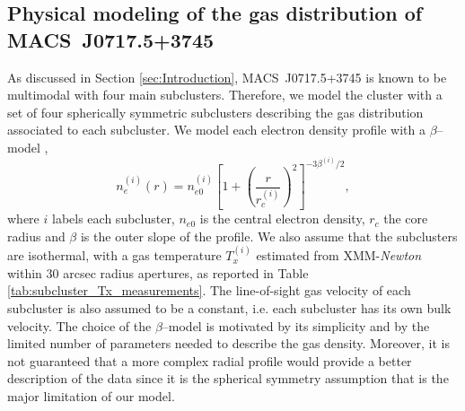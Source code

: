 \documentclass[twocolumn,traditabstract]{aa}
\begin{document}
\subsection{Physical modeling of the gas distribution of \mbox{MACS~J0717.5+3745}}\label{sec:Physical_modeling_of_the_gas_distribution}
As discussed in Section \ref{sec:Introduction}, \mbox{MACS~J0717.5+3745} is known to be multimodal with four main subclusters. Therefore, we model the cluster with a set of four spherically symmetric subclusters describing the gas distribution associated to each subcluster. We model each electron density profile with a $\beta$--model \citep{Cavaliere1978},
\begin{equation}
	n_e^{(i)}(r) = n_{e0}^{(i)} \left[1+\left(\frac{r}{r_c^{(i)}}\right)^2 \right]^{-3 \beta^{(i)} /2},
\label{eq:beta_model}
\end{equation}
where $i$ labels each subcluster, $n_{e0}$ is the central electron density, $r_c$ the core radius and $\beta$ is the outer slope of the profile. We also assume that the subclusters are isothermal, with a gas temperature $T_x^{(i)}$ estimated from XMM-\textit{Newton} within 30 arcsec radius apertures, as reported in Table \ref{tab:subcluster_Tx_measurements}. The line-of-sight gas velocity of each subcluster is also assumed to be a constant, i.e. each subcluster has its own bulk velocity. The choice of the $\beta$--model is motivated by its simplicity and by the limited number of parameters needed to describe the gas density. Moreover, it is not guaranteed that a more complex radial profile would provide a better description of the data since it is the spherical symmetry assumption that is the major limitation of our model.
\end{document}
